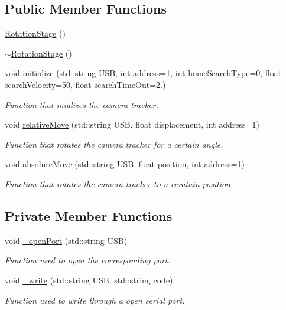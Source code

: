 \subsection*{Public Member Functions}
\begin{DoxyCompactItemize}
\item 
\hyperlink{class_rotation_stage_a14ae00fd0137138b8fa3c653498d13e9}{Rotation\+Stage} ()
\item 
\hyperlink{class_rotation_stage_a3023bae2d8de9f084036de453d8ac374}{$\sim$\+Rotation\+Stage} ()
\item 
void \hyperlink{class_rotation_stage_a47d308cbc52332ea2df332ecea062bae}{initialize} (std\+::string U\+SB, int address=1, int home\+Search\+Type=0, float search\+Velocity=50, float search\+Time\+Out=2.)
\begin{DoxyCompactList}\small\item\em Function that inializes the camera tracker. \end{DoxyCompactList}\item 
void \hyperlink{class_rotation_stage_a6f465da2aaca6b2dc6e808135e3c27e3}{relative\+Move} (std\+::string U\+SB, float displacement, int address=1)
\begin{DoxyCompactList}\small\item\em Function that rotates the camera tracker for a certain angle. \end{DoxyCompactList}\item 
void \hyperlink{class_rotation_stage_a999761588e3c6a2b2c94f9e5d03b42f2}{absolute\+Move} (std\+::string U\+SB, float position, int address=1)
\begin{DoxyCompactList}\small\item\em Function that rotates the camera tracker to a ceratain position. \end{DoxyCompactList}\end{DoxyCompactItemize}
\subsection*{Private Member Functions}
\begin{DoxyCompactItemize}
\item 
void \hyperlink{class_rotation_stage_a8c120bd6de719b9aee263b421850bdaf}{\+\_\+open\+Port} (std\+::string U\+SB)
\begin{DoxyCompactList}\small\item\em Function used to open the corresponding port. \end{DoxyCompactList}\item 
void \hyperlink{class_rotation_stage_afb2393a3cac78176407e8e2d31a6cef4}{\+\_\+write} (std\+::string U\+SB, std\+::string code)
\begin{DoxyCompactList}\small\item\em Function used to write through a open serial port. \end{DoxyCompactList}\end{DoxyCompactItemize}
